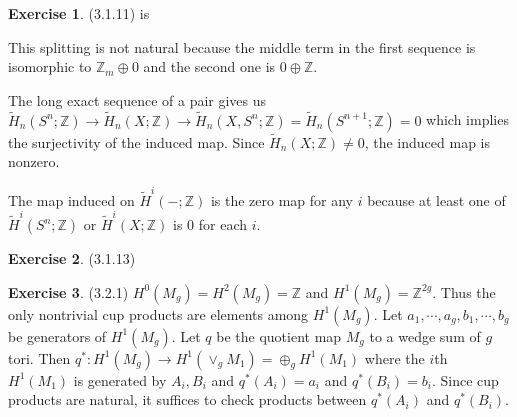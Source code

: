 \documentclass[12pt, psamsfonts]{amsart}
\theoremstyle{definition}
\newtheorem*{exer}{Exercise}
\theoremstyle{remark}
\numberwithin{equation}{section}
\begin{document}
\begin{exer}{(3.1.11)}
  is

  \begin{center}
  \end{center}

  This splitting is not natural because the middle term in the first sequence is isomorphic to $\mathbb{Z}_m \oplus 0$ and the second one is $0 \oplus \mathbb{Z}$.


  The long exact sequence of a pair gives us $\tilde{H}_n(S^n; \mathbb{Z}) \rightarrow \tilde{H}_n(X; \mathbb{Z}) \rightarrow \tilde{H}_n(X, S^n; \mathbb{Z}) = \tilde{H}_n(S^{n + 1}; \mathbb{Z}) = 0$ which implies the surjectivity of the induced map.
  Since $\tilde{H}_n(X; \mathbb{Z}) \ne 0$, the induced map is nonzero.

  The map induced on $\tilde{H}^i(-;\mathbb{Z})$ is the zero map for any $i$ because at least one of $\tilde{H}^i(S^n; \mathbb{Z})$ or $\tilde{H}^i(X; \mathbb{Z})$ is 0 for each $i$.
\end{exer}

\begin{exer}{(3.1.13)}
\end{exer}

\begin{exer}{(3.2.1)}
  $H^0(M_g) = H^2(M_g) = \mathbb{Z}$ and $H^1(M_g) = \mathbb{Z}^{2g}$.
  Thus the only nontrivial cup products are elements among $H^1(M_g)$.
  Let $a_1, \cdots, a_g, b_1, \cdots, b_g$ be generators of $H^1(M_g)$.
  Let $q$ be the quotient map $M_g$ to a wedge sum of $g$ tori.
  Then $q^{\ast}: H^1(M_g) \rightarrow H^1(\vee_{g} M_1) = \oplus_g H^1(M_1)$ where the $i$th $H^1(M_1)$ is generated by $A_i, B_i$ and $q^{\ast}(A_i) = a_i$ and $q^{\ast}(B_i) = b_i$.
  Since cup products are natural, it suffices to check products between $q^{\ast}(A_i)$ and $q^{\ast}(B_i)$.
\end{exer}
\end{document}
